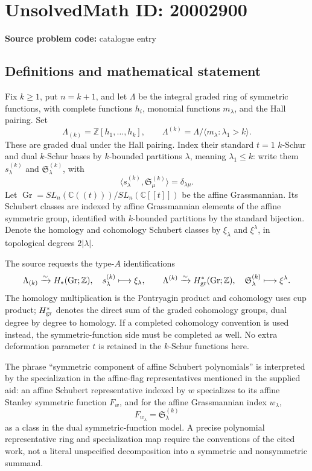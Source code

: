\documentclass[11pt]{article}
\newcommand{\Z}{\mathbb{Z}}
\newcommand{\C}{\mathbb{C}}
\begin{document}
\section*{UnsolvedMath ID: 20002900}
\textbf{Source problem code:} catalogue entry
\subsection{Definitions and mathematical statement}
Fix \(k\ge1\), put \(n=k+1\), and let \(\Lambda\) be the integral graded ring of symmetric functions, with complete functions \(h_i\), monomial functions \(m_\lambda\), and the Hall pairing. Set
\[
\Lambda_{(k)}=\Z[h_1,\ldots,h_k],\qquad
\Lambda^{(k)}=\Lambda/\langle m_\lambda:\lambda_1>k\rangle.
\]
These are graded dual under the Hall pairing. Index their standard \(t=1\) \(k\)-Schur and dual \(k\)-Schur bases by \(k\)-bounded partitions \(\lambda\), meaning \(\lambda_1\le k\): write them \(s_\lambda^{(k)}\) and \(\mathfrak S_\lambda^{(k)}\), with
\[
\langle s_\lambda^{(k)},\mathfrak S_\mu^{(k)}\rangle=\delta_{\lambda\mu}.
\]
Let \(\operatorname{Gr}=SL_n(\C((t)))/SL_n(\C[[t]])\) be the affine Grassmannian. Its Schubert classes are indexed by affine Grassmannian elements of the affine symmetric group, identified with \(k\)-bounded partitions by the standard bijection. Denote the homology and cohomology Schubert classes by \(\xi_\lambda\) and \(\xi^\lambda\), in topological degrees \(2|\lambda|\).

The source requests the type-\(A\) identifications
\[
\Lambda_{(k)}\xrightarrow{\sim}H_*(\operatorname{Gr};\Z),
\quad s_\lambda^{(k)}\longmapsto\xi_\lambda,
\qquad
\Lambda^{(k)}\xrightarrow{\sim}H^*_{\rm gr}(\operatorname{Gr};\Z),
\quad\mathfrak S_\lambda^{(k)}\longmapsto\xi^\lambda.
\]
The homology multiplication is the Pontryagin product and cohomology uses cup product; \(H^*_{\rm gr}\) denotes the direct sum of the graded cohomology groups, dual degree by degree to homology. If a completed cohomology convention is used instead, the symmetric-function side must be completed as well. No extra deformation parameter \(t\) is retained in the \(k\)-Schur functions here.

The phrase ``symmetric component of affine Schubert polynomials'' is interpreted by the specialization in the affine-flag representatives mentioned in the supplied aid: an affine Schubert representative indexed by \(w\) specializes to its affine Stanley symmetric function \(F_w\), and for the affine Grassmannian index \(w_\lambda\),
\[
F_{w_\lambda}=\mathfrak S_\lambda^{(k)}
\]
as a class in the dual symmetric-function model. A precise polynomial representative ring and specialization map require the conventions of the cited work, not a literal unspecified decomposition into a symmetric and nonsymmetric summand.
\end{document}
